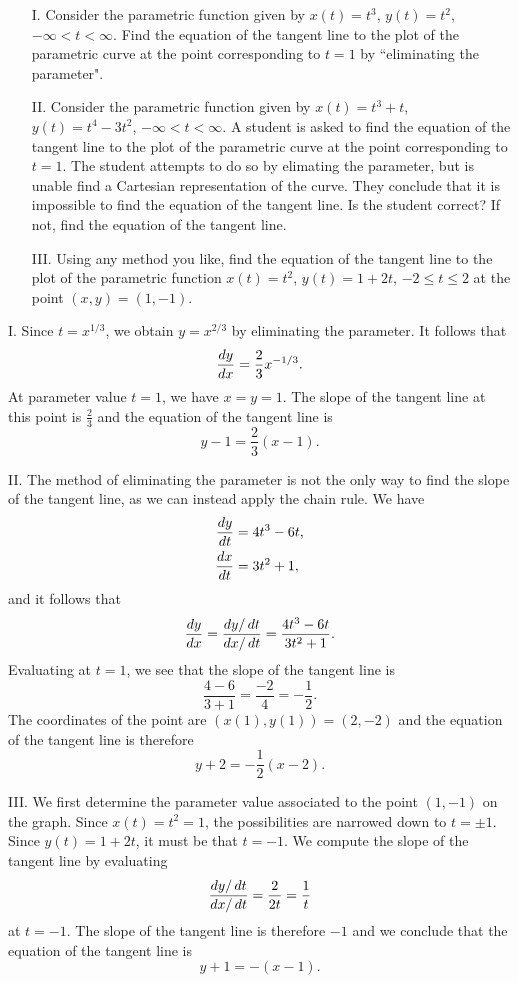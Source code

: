 \documentclass[]{ximera}
\begin{document}
\begin{problem}
\begin{itemize}
\item[I.] Consider the parametric function given by $x(t)=t^3$, $y(t)=t^2$, $-\infty <  t < \infty$. Find the equation of the tangent line to the plot of the parametric curve at the point corresponding to $t=1$ by ``eliminating the parameter". 

\item[II.] Consider the parametric function given by $x(t)=t^3+t$, $y(t)=t^4-3t^2$, $-\infty <  t < \infty$. A student is asked to find the equation of the tangent line to the plot of the parametric curve at the point corresponding to $t=1$. The student attempts to do so by elimating the parameter, but is unable find a Cartesian representation of the curve. They conclude that it is impossible to find the equation of the tangent line. Is the student correct? If not, find the equation of the tangent line.

\item[III.] Using any method you like, find the equation of the tangent line to the plot of the parametric function $x(t)=t^2$, $y(t)=1+2t$, $-2 \leq t \leq 2$ at the point $(x,y)=(1,-1)$. 
\end{itemize}

\begin{solution}
I. Since $t = x^{1/3}$, we obtain $y=x^{2/3}$ by eliminating the parameter. It follows that
$$
\frac{\mathop{}\!d y}{\mathop{}\!d x} = \frac{2}{3} x^{-1/3}.
$$
At parameter value $t=1$, we have $x = y = 1$. The slope of the tangent line at this point is $\frac{2}{3}$ and the equation of the tangent line is 
$$
y - 1 = \frac{2}{3}(x-1).
$$

II. The method of eliminating the parameter is not the only way to find the slope of the tangent line, as we can instead apply the chain rule. We have
\begin{align*}
\frac{\mathop{}\!d y}{\mathop{}\!d t} &= 4t^3 - 6t, \\
\frac{\mathop{}\!d x}{\mathop{}\!d t} &= 3 t^2 + 1,
\end{align*}
and it follows that 
$$
\frac{\mathop{}\!d y}{\mathop{}\!d x} = \frac{\mathop{}\!d y/ \mathop{}\!d t}{\mathop{}\!d x/ \mathop{}\!d t} = \frac{4t^3 - 6t}{3t^2 + 1}.
$$
Evaluating at $t = 1$, we see that the slope of the tangent line is 
$$
\frac{4 - 6}{3 + 1} = \frac{-2}{4} = - \frac{1}{2}.
$$
The coordinates of the point are $(x(1),y(1)) = (2,-2)$ and the equation of the tangent line is therefore
$$
y+2 = -\frac{1}{2} (x - 2).
$$

III. We first determine the parameter value associated to the point $(1,-1)$ on the graph. Since $x(t) = t^2 = 1$, the possibilities are narrowed down to $t = \pm 1$. Since $y(t) = 1+2t$, it must be that $t=-1$. We compute the slope of the tangent line by evaluating 
$$
\frac{\mathop{}\!d y/ \mathop{}\!d t}{\mathop{}\!d x / \mathop{}\!d t} = \frac{2}{2t} = \frac{1}{t}
$$
at $t = -1$. The slope of the tangent line is therefore $-1$ and we conclude that the equation of the tangent line is
$$
y + 1 = -(x-1).
$$
\end{solution}
\end{problem}
\end{document}
